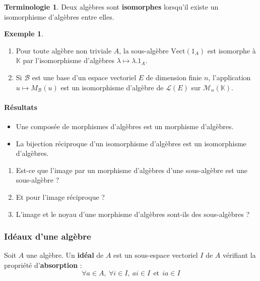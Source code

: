 \documentclass[french]{article}
\newcommand{\K}{\mathbb{K}}
\newcommand{\Vect}{\text{Vect}}
\theoremstyle{plain}
\theoremstyle{definition}
\newtheorem*{ex}{Exemple}
\newtheorem*{terminologie}{Terminologie}
\theoremstyle{remark}
\begin{document}
\begin{terminologie}
	Deux algèbres sont \textbf{isomorphes} lorsqu'il existe un isomorphisme d'algèbres entre elles.
\end{terminologie}

\begin{ex}
	\begin{enumerate}
		\item Pour toute algèbre non triviale $A$, la sous-algèbre $\Vect(1_A)$ est isomorphe à $\K$ par l'isomorphisme d'algèbres $\lambda\mapsto\lambda.1_A$.
		\item Si $\mathcal{B}$ est une base d'un espace vectoriel $E$ de dimension finie $n$, l'application $u\mapsto M_\mathcal{B}(u)$ est un isomorphisme d'algèbre de $\mathcal{L}(E)$ sur $\mathcal{M}_n(\K)$.
	\end{enumerate}
\end{ex}

\paragraph{Résultats}
\begin{itemize}
	\item Une composée de morphismes d'algèbres est un morphisme d'algèbres.
	\item La bijection réciproque d'un isomorphisme d'algèbres est un isomorphisme d'algèbres.
\end{itemize}

\begin{exo}
	\begin{enumerate}
		\item Est-ce que l'image par un morphisme d'algèbres d'une sous-algèbre est une sous-algèbre ?
		\item Et pour l'image réciproque ?
		\item L'image et le noyau d'une morphisme d'algèbres sont-ils des sous-algèbres ?
	\end{enumerate}
\end{exo}

\subsubsection*{Idéaux d'une algèbre}

\begin{dfn}
	Soit $A$ une algèbre. Un \textbf{idéal} de $A$ est un sous-espace vectoriel $I$ de $A$ vérifiant la propriété d'\textbf{absorption} : $$\forall a\in A,\ \forall i\in I,\ ai\in I\ \ \text{et}\ \ ia\in I$$
\end{dfn}
\end{document}
